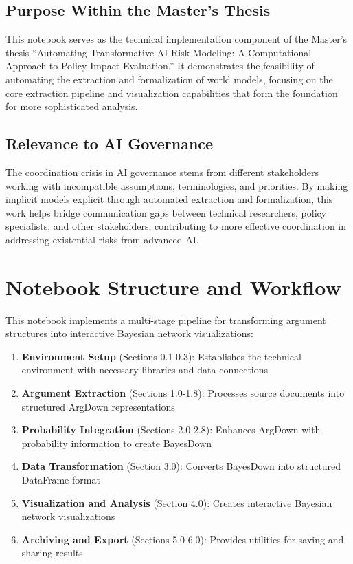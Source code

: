 \documentclass[
  11pt,
  letterpaper,
]{book}
\begin{document}
\subsection{Purpose Within the Master's
Thesis}\label{purpose-within-the-masters-thesis}

This notebook serves as the technical implementation component of the
Master's thesis ``Automating Transformative AI Risk Modeling: A
Computational Approach to Policy Impact Evaluation.'' It demonstrates
the feasibility of automating the extraction and formalization of world
models, focusing on the core extraction pipeline and visualization
capabilities that form the foundation for more sophisticated analysis.

\subsection{Relevance to AI
Governance}\label{relevance-to-ai-governance}

The coordination crisis in AI governance stems from different
stakeholders working with incompatible assumptions, terminologies, and
priorities. By making implicit models explicit through automated
extraction and formalization, this work helps bridge communication gaps
between technical researchers, policy specialists, and other
stakeholders, contributing to more effective coordination in addressing
existential risks from advanced AI.

\section{Notebook Structure and
Workflow}\label{notebook-structure-and-workflow}

This notebook implements a multi-stage pipeline for transforming
argument structures into interactive Bayesian network visualizations:

\begin{enumerate}
\def\labelenumi{\arabic{enumi}.}
\item
  \textbf{Environment Setup} (Sections 0.1-0.3): Establishes the
  technical environment with necessary libraries and data connections
\item
  \textbf{Argument Extraction} (Sections 1.0-1.8): Processes source
  documents into structured ArgDown representations
\item
  \textbf{Probability Integration} (Sections 2.0-2.8): Enhances ArgDown
  with probability information to create BayesDown
\item
  \textbf{Data Transformation} (Section 3.0): Converts BayesDown into
  structured DataFrame format
\item
  \textbf{Visualization and Analysis} (Section 4.0): Creates interactive
  Bayesian network visualizations
\item
  \textbf{Archiving and Export} (Sections 5.0-6.0): Provides utilities
  for saving and sharing results
\end{enumerate}
\end{document}
